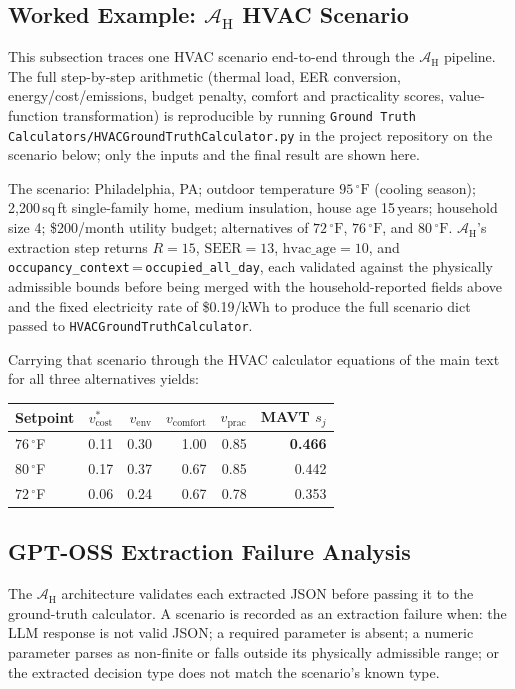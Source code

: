 \documentclass[11pt]{article}
\begin{document}
\subsection{Worked Example: \texorpdfstring{$\mathcal{A}_{\text{H}}$}{A_H} HVAC Scenario}
\label{app:hvac_worked}

This subsection traces one HVAC scenario end-to-end through the
$\mathcal{A}_{\text{H}}$ pipeline. The full step-by-step arithmetic
(thermal load, EER conversion, energy/cost/emissions, budget penalty,
comfort and practicality scores, value-function transformation) is
reproducible by running \texttt{Ground Truth Calculators/HVACGroundTruthCalculator.py}
in the project repository on the scenario below; only the inputs and the
final result are shown here.

The scenario: Philadelphia, PA; outdoor temperature $95\,^\circ\text{F}$
(cooling season); 2{,}200\,sq\,ft single-family home, medium insulation,
house age 15\,years; household size 4; \$200/month utility budget;
alternatives of $72\,^\circ\text{F}$, $76\,^\circ\text{F}$, and
$80\,^\circ\text{F}$. $\mathcal{A}_{\text{H}}$'s extraction step returns
$R=15$, $\text{SEER}=13$, $\text{hvac\_age}=10$, and
\texttt{occupancy\_context}\,=\,\texttt{occupied\_all\_day}, each validated
against the physically admissible bounds
before being merged with the household-reported fields above and the fixed
electricity rate of \$0.19/kWh to produce the full scenario dict passed to
\texttt{HVACGroundTruthCalculator}.

Carrying that scenario through the HVAC calculator equations of the main
text for all three alternatives yields:
\begin{center}
\begin{tabular}{@{}lrrrrr@{}}
\toprule
\textbf{Setpoint} & \textbf{$v_{\text{cost}}^{*}$} & \textbf{$v_{\text{env}}$}
  & \textbf{$v_{\text{comfort}}$} & \textbf{$v_{\text{prac}}$}
  & \textbf{MAVT $s_j$} \\
\midrule
$76\,^\circ$F & 0.11 & 0.30 & 1.00 & 0.85 & \textbf{0.466} \\
$80\,^\circ$F & 0.17 & 0.37 & 0.67 & 0.85 & 0.442 \\
$72\,^\circ$F & 0.06 & 0.24 & 0.67 & 0.78 & 0.353 \\
\bottomrule
\end{tabular}
\end{center}
\subsection{GPT-OSS Extraction Failure Analysis}
\label{app:extraction_failure_analysis}
The $\mathcal{A}_{\text{H}}$ architecture validates each extracted JSON
before passing it to the ground-truth calculator. A scenario is recorded
as an extraction failure when: the LLM response is not valid JSON; a
required parameter is absent; a numeric parameter parses as non-finite or
falls outside its physically admissible range; or the extracted decision
type does not match the scenario's known type.
\end{document}

